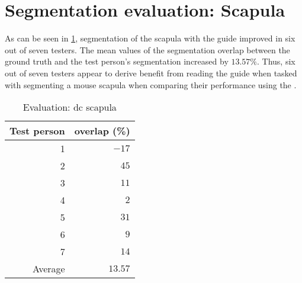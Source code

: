 \section{Segmentation evaluation: Scapula}\label{s:seg-eval-scapula}
As can be seen in \cref{tab:scapula-overlap}, segmentation of the scapula with the guide improved in six out of seven testers.
The mean values of the segmentation overlap between the ground truth and the test person's segmentation increased by $13.57\%$.
Thus, six out of seven testers appear to derive benefit from reading the guide when tasked with segmenting a
mouse scapula when comparing their performance using the .
\begin{table}[ht]
	\begin{center}
		\begin{tabular}{r r}
			\textbf{Test person} & \textbf{overlap (\%)} \\
			\hline
			1                    & $-17$                 \\
			2                    & $45$                  \\
			3                    & $11$                  \\
			4                    & $2$                   \\
			5                    & $31$                  \\
			6                    & $9$                   \\
			7                    & $14$                  \\
			\hline
			Average              & $13.57$               \\
		\end{tabular}
		\caption{Evaluation: \acrshort{dc} scapula}\label{tab:scapula-overlap}
	\end{center}
\end{table}

